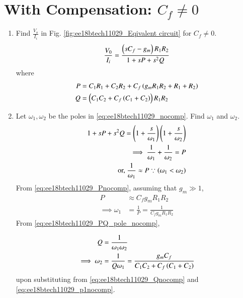 \section{With Compensation: $C_f \ne 0$}
\begin{enumerate}[label=\thesection.\arabic*.,ref=\thesection.\theenumi]
\item Find $\frac{V_o}{I_i}$ in Fig. 	\ref{fig:ee18btech11029_Eqivalent circuit} for $C_f \ne 0$.
\\
\solution 
%
\begin{align}
    \frac{V_{0}}{I_{i}} = \frac{\brak{sC_{f}-g_{m}}R_{1}R_{2}}{1+sP+s^{2}Q}
    \label{eq:ee18btech11029_nocomp}
\end{align}
where
\begin{align}
    \label{eq:ee18btech11029_Pnocomp}
    P&={C_{1}R_{1}+C_{2}R_{2}+C_{f}\brak{g_{m}R_{1}R_{2}+R_{1}+R_{2}}}\\
    Q&={\brak{C_{1}C_{2}+C_{f}\brak{C_{1}+C_{2}}}R_{1}R_{2}}
    \label{eq:ee18btech11029_Qnocomp}
\end{align}
\item Let $\omega_1, \omega_2$ be the poles in     \eqref{eq:ee18btech11029_nocomp}.  Find $ \omega_1$ and $ \omega_2$.
\\
\solution 
\begin{align}
    \label{eq:ee18btech11029_PQ_pole_nocomp}
1+sP+s^{2}Q = \brak{1+\frac{s}{\omega_{1}}}\brak{1+\frac{s}{\omega_{2}}}&
\\
\implies \frac{1}{\omega_{1}} + \frac{1}{\omega_{2}} = P &
\\
\text{or, } \frac{1}{\omega_{1}} \approx P  \because \brak{\omega_1 < \omega_2} &
\end{align}
From     \eqref{eq:ee18btech11029_Pnocomp}, assuming that $g_m \gg 1$, 
\begin{align}
    P& \approx C_{f}g_{m}R_{1}R_{2}
\\
\implies \omega_{1} &= \frac{1}{P} = \frac{1}{C_{f}g_{m}R_{1}R_{2}}
    \label{eq:ee18btech11029_p1nocomp}
\end{align}
%
From      \eqref{eq:ee18btech11029_PQ_pole_nocomp},

\begin{align}
Q &= \frac{1}{\omega_1\omega_2}
\\
\implies  \omega_2 &= \frac{1}{Q\omega_1}
 = \frac{g_{m}C_{f}}{{C_{1}C_{2}+C_{f}\brak{C_{1}+C_{2}}}}
    \label{eq:ee18btech11029_4nocomp}
\end{align}
upon substituting from     \eqref{eq:ee18btech11029_Qnocomp}
and     \eqref{eq:ee18btech11029_p1nocomp}.


\end{enumerate}
